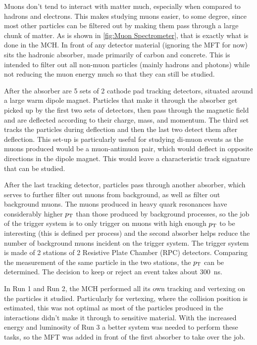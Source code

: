 Muons don't tend to interact with matter much, especially when compared to hadrons and electrons. This makes studying muons easier, to some degree, since most other particles can be filtered out by making them pass through a large chunk of matter. As is shown in \cref{fig:Muon Spectrometer}, that is exactly what is done in the MCH. In front of any detector material (ignoring the MFT for now) sits the hadronic absorber, made primarily of carbon and concrete. This is intended to filter out all non-muon particles (mainly hadrons and photons) while not reducing the muon energy much so that they can still be studied. 

After the absorber are 5 sets of 2 cathode pad tracking detectors, situated around a large warm dipole magnet. Particles that make it through the absorber get picked up by the first two sets of detectors, then pass through the magnetic field and are deflected according to their charge, mass, and momentum. The third set tracks the particles during deflection and then the last two detect them after deflection. This set-up is particularly useful for studying di-muon events as the muons produced would be a muon-antimuon pair, which would deflect in opposite directions in the dipole magnet. This would leave a characteristic track signature that can be studied.

After the last tracking detector, particles pass through another absorber, which serves to further filter out muons from background, as well as filter out background muons. The muons produced in heavy quark resonances have considerably higher $p_\mathrm{T}$ than those produced by background processes, so the job of the trigger system is to only trigger on muons with high enough $p_\mathrm{T}$ to be interesting (this is defined per process) and the second absorber helps reduce the number of background muons incident on the trigger system. The trigger system is made of 2 stations of 2 Resistive Plate Chamber (RPC) detectors. Comparing the measurement of the same particle in the two stations, the $p_\mathrm{T}$ can be determined. The decision to keep or reject an event takes about \SI{300}{\nano\second}.

In Run 1 and Run 2, the MCH performed all its own tracking and vertexing on the particles it studied. Particularly for vertexing, where the collision position is estimated, this was not optimal as most of the particles produced in the interactions didn't make it through to sensitive material. With the increased energy and luminosity of Run 3 a better system was needed to perform these tasks, so the MFT was added in front of the first absorber to take over the job.



